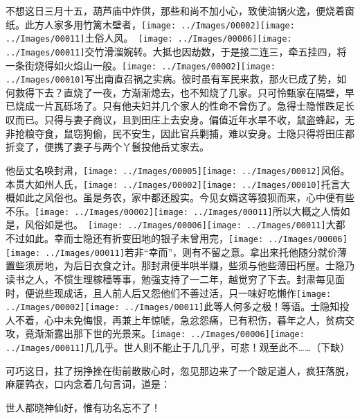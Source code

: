 不想这日三月十五，葫芦庙中炸供，那些和尚不加小心，致使油锅火逸，便烧着窗纸。此方人家多用竹篱木壁者，{{\texttt{[image: ../Images/00002]}\texttt{[image: ../Images/00011]}\footnotesize \kaishu 土俗人风。　}\texttt{[image: ../Images/00006]}\texttt{[image: ../Images/00011]}\footnotesize \kaishu 交竹滑溜婉转。}大抵也因劫数，于是接二连三，牵五挂四，将一条街烧得如火焰山一般。{\texttt{[image: ../Images/00002]}\texttt{[image: ../Images/00010]}\footnotesize \kaishu 写出南直召祸之实病。}彼时虽有军民来救，那火已成了势，如何救得下去？直烧了一夜，方渐渐熄去，也不知烧了几家。只可怜甄家在隔壁，早已烧成一片瓦砾场了。只有他夫妇并几个家人的性命不曾伤了。急得士隐惟跌足长叹而已。只得与妻子商议，且到田庄上去安身。偏值近年水旱不收，鼠盗蜂起，无非抢粮夺食，鼠窃狗偷，民不安生，因此官兵剿捕，难以安身。士隐只得将田庄都折变了，便携了妻子与两个丫鬟投他岳丈家去。

他岳丈名唤封肃，{\texttt{[image: ../Images/00005]}\texttt{[image: ../Images/00012]}\footnotesize \kaishu 风俗。}本贯大如州人氏，{\texttt{[image: ../Images/00002]}\texttt{[image: ../Images/00010]}\footnotesize \kaishu 托言大概如此之风俗也。}虽是务农，家中都还殷实。今见女婿这等狼狈而来，心中便有些不乐。{{\texttt{[image: ../Images/00002]}\texttt{[image: ../Images/00011]}\footnotesize \kaishu 所以大概之人情如是，风俗如是也。　}\texttt{[image: ../Images/00006]}\texttt{[image: ../Images/00011]}\footnotesize \kaishu 大都不过如此。}幸而士隐还有折变田地的银子未曾用完，{\texttt{[image: ../Images/00006]}\texttt{[image: ../Images/00011]}\footnotesize \kaishu 若非``幸而''，则有不留之意。}拿出来托他随分就价薄置些须房地，为后日衣食之计。那封肃便半哄半赚，些须与他些薄田朽屋。士隐乃读书之人，不惯生理稼穑等事，勉强支持了一二年，越觉穷了下去。封肃每见面时，便说些现成话，且人前人后又怨他们不善过活，只一味好吃懒作{\texttt{[image: ../Images/00002]}\texttt{[image: ../Images/00011]}\footnotesize \kaishu 此等人何多之极！}等语。士隐知投人不着，心中未免悔恨，再兼上年惊唬，急忿怨痛，已有积伤，暮年之人，贫病交攻，竟渐渐露出那下世的光景来。{{\texttt{[image: ../Images/00006]}\texttt{[image: ../Images/00011]}\footnotesize \kaishu 几几乎。世人则不能止于几几乎，可悲！观至此不\ldots{}\ldots{}}（下缺）}

可巧这日，拄了拐挣挫在街前散散心时，忽见那边来了一个跛足道人，疯狂落脱，麻屣鹑衣，口内念着几句言词，道是：

世人都晓神仙好，惟有功名忘不了！

